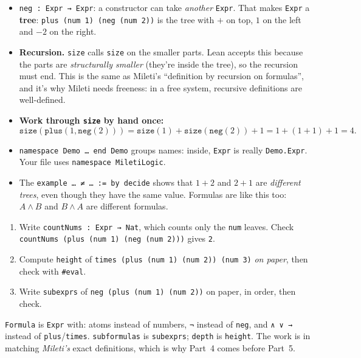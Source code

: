 \documentclass[11pt,a4paper]{article}
\newcommand{\code}[1]{\texttt{#1}}
\begin{document}
\begin{itemize}
\item \code{neg : Expr → Expr}: a constructor can take \emph{another} \code{Expr}. That makes \code{Expr} a \textbf{tree}: \code{plus (num 1) (neg (num 2))} is the tree with $+$ on top, $1$ on the left and $-2$ on the right.
\item \textbf{Recursion.} \code{size} calls \code{size} on the smaller parts. Lean accepts this because the parts are \emph{structurally smaller} (they're inside the tree), so the recursion must end. This is the same as Mileti's ``definition by recursion on formulas'', and it's why Mileti needs freeness: in a free system, recursive definitions are well-defined.
\item \textbf{Work through \code{size} by hand once:}
\[\code{size}(\code{plus}(1, \code{neg}(2))) = \code{size}(1) + \code{size}(\code{neg}(2)) + 1 = 1 + (1+1) + 1 = 4.\]
\item \code{namespace Demo … end Demo} groups names: inside, \code{Expr} is really \code{Demo.Expr}. Your file uses \code{namespace MiletiLogic}.
\item The \code{example … ≠ … := by decide} shows that $1+2$ and $2+1$ are \emph{different trees}, even though they have the same value. Formulas are like this too: $A\wedge B$ and $B\wedge A$ are different formulas.
\end{itemize}
\begin{try}
\begin{enumerate}
\item Write \code{countNums : Expr → Nat}, which counts only the \code{num} leaves. Check \code{countNums (plus (num 1) (neg (num 2)))} gives \code{2}.
\item Compute \code{height} of \code{times (plus (num 1) (num 2)) (num 3)} \emph{on paper}, then check with \code{\#eval}.
\item Write \code{subexprs} of \code{neg (plus (num 1) (num 2))} on paper, in order, then check.
\end{enumerate}
\end{try}
\begin{tip}
\code{Formula} is \code{Expr} with: atoms instead of numbers, \code{¬} instead of \code{neg}, and \code{∧ ∨ →} instead of \code{plus}/\code{times}. \code{subformulas} is \code{subexprs}; \code{depth} is \code{height}. The work is in matching \emph{Mileti's} exact definitions, which is why Part~4 comes before Part~5.
\end{tip}
\end{document}

